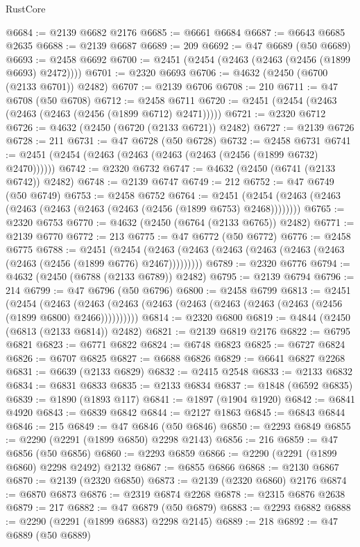 \begin{lexlean}{RustCore}
\begin{coremodule}
@6684 := @2139 @6682 @2176
@6685 := @6661 @6684
@6687 := @6643 @6685 @2635
@6688 := @2139 @6687
@6689 := 209
@6692 := @47 @6689 (@50 @6689)
@6693 := @2458 @6692
@6700 := @2451 (@2454 (@2463 (@2463 (@2456 (@1899 @6693) @2472))))
@6701 := @2320 @6693
@6706 := @4632 (@2450 (@6700 (@2133 @6701)) @2482)
@6707 := @2139 @6706
@6708 := 210
@6711 := @47 @6708 (@50 @6708)
@6712 := @2458 @6711
@6720 := @2451 (@2454 (@2463 (@2463 (@2463 (@2456 (@1899 @6712) @2471)))))
@6721 := @2320 @6712
@6726 := @4632 (@2450 (@6720 (@2133 @6721)) @2482)
@6727 := @2139 @6726
@6728 := 211
@6731 := @47 @6728 (@50 @6728)
@6732 := @2458 @6731
@6741 := @2451 (@2454 (@2463 (@2463 (@2463 (@2463 (@2456 (@1899 @6732) @2470))))))
@6742 := @2320 @6732
@6747 := @4632 (@2450 (@6741 (@2133 @6742)) @2482)
@6748 := @2139 @6747
@6749 := 212
@6752 := @47 @6749 (@50 @6749)
@6753 := @2458 @6752
@6764 := @2451 (@2454 (@2463 (@2463 (@2463 (@2463 (@2463 (@2463 (@2456 (@1899 @6753) @2468))))))))
@6765 := @2320 @6753
@6770 := @4632 (@2450 (@6764 (@2133 @6765)) @2482)
@6771 := @2139 @6770
@6772 := 213
@6775 := @47 @6772 (@50 @6772)
@6776 := @2458 @6775
@6788 := @2451
    (@2454 (@2463 (@2463 (@2463 (@2463 (@2463 (@2463 (@2463 (@2456 (@1899 @6776) @2467)))))))))
@6789 := @2320 @6776
@6794 := @4632 (@2450 (@6788 (@2133 @6789)) @2482)
@6795 := @2139 @6794
@6796 := 214
@6799 := @47 @6796 (@50 @6796)
@6800 := @2458 @6799
@6813 := @2451
    (@2454
      (@2463 (@2463 (@2463 (@2463 (@2463 (@2463 (@2463 (@2463 (@2456 (@1899 @6800) @2466))))))))))
@6814 := @2320 @6800
@6819 := @4844 (@2450 (@6813 (@2133 @6814)) @2482)
@6821 := @2139 @6819 @2176
@6822 := @6795 @6821
@6823 := @6771 @6822
@6824 := @6748 @6823
@6825 := @6727 @6824
@6826 := @6707 @6825
@6827 := @6688 @6826
@6829 := @6641 @6827 @2268
@6831 := @6639 (@2133 @6829)
@6832 := @2415 @2548
@6833 := @2133 @6832
@6834 := @6831 @6833
@6835 := @2133 @6834
@6837 := @1848 (@6592 @6835)
@6839 := @1890 (@1893 @117)
@6841 := @1897 (@1904 @1920)
@6842 := @6841 @4920
@6843 := @6839 @6842
@6844 := @2127 @1863
@6845 := @6843 @6844
@6846 := 215
@6849 := @47 @6846 (@50 @6846)
@6850 := @2293 @6849
@6855 := @2290 (@2291 (@1899 @6850) @2298 @2143)
@6856 := 216
@6859 := @47 @6856 (@50 @6856)
@6860 := @2293 @6859
@6866 := @2290 (@2291 (@1899 @6860) @2298 @2492) @2132
@6867 := @6855 @6866
@6868 := @2130 @6867
@6870 := @2139 (@2320 @6850)
@6873 := @2139 (@2320 @6860) @2176
@6874 := @6870 @6873
@6876 := @2319 @6874 @2268
@6878 := @2315 @6876 @2638
@6879 := 217
@6882 := @47 @6879 (@50 @6879)
@6883 := @2293 @6882
@6888 := @2290 (@2291 (@1899 @6883) @2298 @2145)
@6889 := 218
@6892 := @47 @6889 (@50 @6889)

\end{coremodule}
\end{lexlean}
